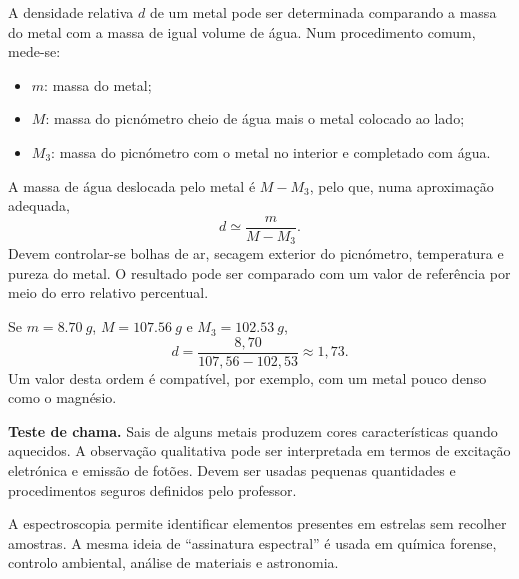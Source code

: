 \documentclass[11pt,a4paper,oneside]{book}
\begin{document}
\begin{atividade}[title=AL 1.3 -- Densidade relativa de metais por picnometria]
A densidade relativa $d$ de um metal pode ser determinada comparando a massa do metal com a massa de igual volume de água. Num procedimento comum, mede-se:
\begin{itemize}
  \item $m$: massa do metal;
  \item $M$: massa do picnómetro cheio de água mais o metal colocado ao lado;
  \item $M_3$: massa do picnómetro com o metal no interior e completado com água.
\end{itemize}
A massa de água deslocada pelo metal é $M-M_3$, pelo que, numa aproximação adequada,
\[
d\simeq\frac{m}{M-M_3}.
\]
Devem controlar-se bolhas de ar, secagem exterior do picnómetro, temperatura e pureza do metal. O resultado pode ser comparado com um valor de referência por meio do erro relativo percentual.
\end{atividade}

\begin{exemplo}[title=Exemplo resolvido -- picnometria]
Se $m=\SI{8.70}{g}$, $M=\SI{107.56}{g}$ e $M_3=\SI{102.53}{g}$,
\[
d=\frac{8{,}70}{107{,}56-102{,}53}\approx1{,}73.
\]
Um valor desta ordem é compatível, por exemplo, com um metal pouco denso como o magnésio.
\end{exemplo}

\begin{atividade}[title=Extensão -- Teste de chama]
\textbf{Teste de chama.} Sais de alguns metais produzem cores características quando aquecidos. A observação qualitativa pode ser interpretada em termos de excitação eletrónica e emissão de fotões. Devem ser usadas pequenas quantidades e procedimentos seguros definidos pelo professor.
\end{atividade}

\begin{mundo}
A espectroscopia permite identificar elementos presentes em estrelas sem recolher amostras. A mesma ideia de ``assinatura espectral'' é usada em química forense, controlo ambiental, análise de materiais e astronomia.
\end{mundo}
\end{document}

